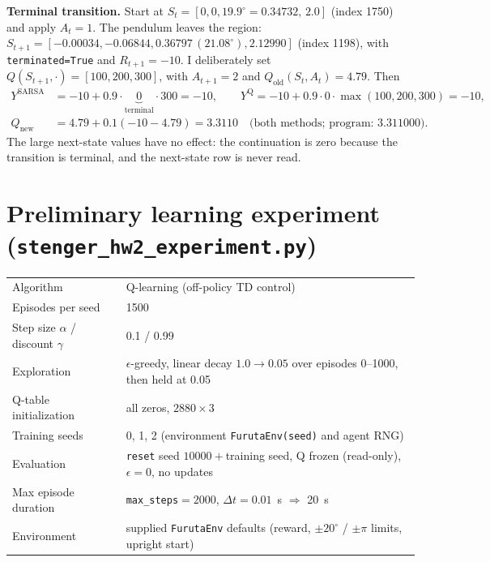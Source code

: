 \documentclass[11pt]{article}
\begin{document}
\textbf{Terminal transition.} Start at $S_t=[0,0,19.9^\circ{=}0.34732,\,2.0]$
(index 1750) and apply $A_t=1$. The pendulum leaves the region:
$S_{t+1}=[-0.00034,-0.06844,0.36797\,(21.08^\circ),2.12990]$ (index 1198), with
\texttt{terminated=True} and $R_{t+1}=-10$. I deliberately set
$Q(S_{t+1},\cdot)=[100,200,300]$, with $A_{t+1}=2$ and $Q_{\text{old}}(S_t,A_t)=4.79$. Then
\begin{align*}
Y^{\text{SARSA}} &= -10 + 0.9\cdot\underbrace{0}_{\text{terminal}}\cdot 300 = -10,\qquad
Y^{\text{Q}} = -10 + 0.9\cdot 0\cdot\max(100,200,300) = -10,\\
Q_{\text{new}} &= 4.79+0.1(-10-4.79) = 3.3110 \quad\text{(both methods; program: 3.311000)}.
\end{align*}
The large next-state values have no effect: the continuation is zero because the
transition is terminal, and the next-state row is never read.

\section{Preliminary learning experiment (\texttt{stenger\_hw2\_experiment.py})}

\begin{center}\small
\begin{tabular}{ll}\toprule
Algorithm & Q-learning (off-policy TD control)\\
Episodes per seed & 1500\\
Step size $\alpha$ / discount $\gamma$ & 0.1 / 0.99\\
Exploration & $\epsilon$-greedy, linear decay $1.0\to0.05$ over episodes 0--1000, then held at 0.05\\
Q-table initialization & all zeros, $2880\times3$\\
Training seeds & 0, 1, 2 (environment \texttt{FurutaEnv(seed)} and agent RNG)\\
Evaluation & \texttt{reset} seed $10000+$training seed, Q frozen (read-only), $\epsilon=0$, no updates\\
Max episode duration & \texttt{max\_steps}$=2000$, $\Delta t=0.01$~s $\Rightarrow$ 20~s\\
Environment & supplied \texttt{FurutaEnv} defaults (reward, $\pm20^\circ$ / $\pm\pi$ limits, upright start)\\\bottomrule
\end{tabular}
\end{center}
\end{document}
